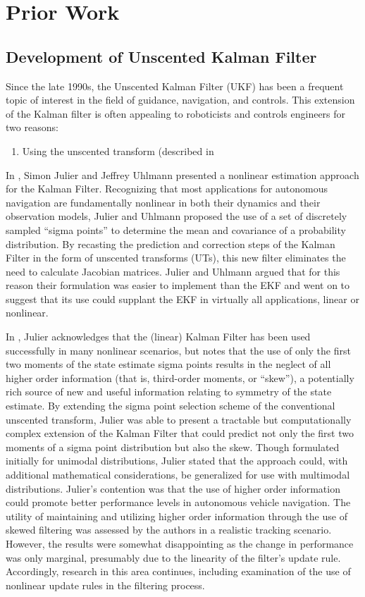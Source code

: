 \chapter{Prior Work}

\section{Development of Unscented Kalman Filter}

Since the late 1990s, the Unscented Kalman Filter (UKF) has been a frequent topic of interest in the field of guidance, navigation, and controls. This extension of the Kalman filter is often appealing to roboticists and controls engineers for two reasons:
\begin{enumerate}
\item Using the unscented transform (described in 
\end{enumerate}

In \cite{Julier1997}, Simon Julier and Jeffrey Uhlmann presented a nonlinear estimation approach for the Kalman Filter. Recognizing that most applications for autonomous navigation are fundamentally nonlinear in both their dynamics and their observation models, Julier and Uhlmann proposed the use of a set of discretely sampled ``sigma points'' to determine the mean and covariance of a probability distribution. By recasting the prediction and correction steps of the Kalman Filter in the form of unscented transforms (UTs), this new filter eliminates the need to calculate Jacobian matrices. Julier and Uhlmann argued that for this reason their formulation was easier to implement than the EKF and went on to suggest that its use could supplant the EKF in virtually all applications, linear or nonlinear.

In \cite{Julier1998}, Julier acknowledges that the (linear) Kalman Filter has been used successfully in many nonlinear scenarios, but notes that the use of only the first two moments of the state estimate sigma points results in the neglect of all higher order information (that is, third-order moments, or ``skew''), a potentially rich source of new and useful information relating to symmetry of the state estimate. By extending the sigma point selection scheme of the conventional unscented transform, Julier was able to present a tractable but computationally complex extension of the Kalman Filter that could predict not only the first two moments of a sigma point distribution but also the skew. Though formulated initially for unimodal distributions, Julier stated that the approach could, with additional mathematical considerations, be generalized for use with multimodal distributions. Julier's contention was that the use of higher order information could promote better performance levels in autonomous vehicle navigation. The utility of maintaining and utilizing higher order information through the use of skewed filtering was assessed by the authors in a realistic tracking scenario. However, the results were somewhat disappointing as the change in performance was only marginal, presumably due to the linearity of the filter's update rule. Accordingly, research in this area continues, including examination of the use of nonlinear update rules in the filtering process.

